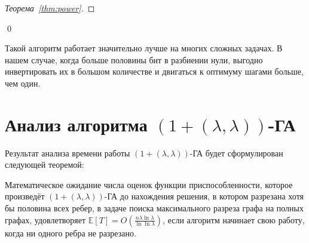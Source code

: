 \documentclass[times]{itmo-student-thesis}
\newcommand{\alglambdaf}{${(1 + (\lambda , \lambda))}$-ГА\xspace}
\newcommand{\ollga}{${(1 + (\lambda , \lambda))}$-ГА\xspace}
\begin{document}
\begin{proof}[Теорема~\ref{thm:power}]


\end{proof}\qed

Такой алгоритм работает значительно лучше на многих сложных задачах.
В нашем случае, когда больше половины бит в разбиении нули, выгодно инвертировать их в большом количестве и двигаться к оптимуму шагами больше, чем один.

\section{Анализ алгоритма \alglambdaf}
Результат анализа времени работы \alglambdaf будет сформулирован следующей теоремой:

\begin{theorem} \label{thm:time}
    Математическое ожидание числа оценок функции приспособленности, которое произведёт \ollga до нахождения решения, в котором разрезана хотя бы половина всех ребер, в задаче поиска максимального разреза графа на полных графах, удовлетворяет $\mathbb{E}[T]=O(\frac{n\lambda \ln \lambda}{\ln \ln \lambda})$, если алгоритм начинает свою работу, когда ни одного ребра не разрезано.
\end{theorem}
\end{document}
